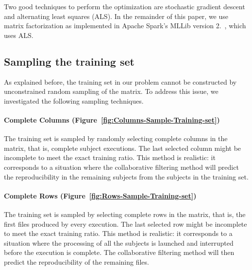 \documentclass[10pt, conference, compsocconf]{IEEEtran}
\newcommand{\todo}[1]{\marginpar{\parbox{18mm}{\flushleft\tiny\color{red}\textbf{TODO}:
      #1}}}
\begin{document}
Two good techniques to perform the optimization are stochastic gradient descent and alternating least squares (ALS). 
In the remainder of this paper, we use matrix factorization as implemented in 
Apache Spark's MLLib version 2.~\todo{xxx.}, which uses ALS.


\subsection{Sampling the training set}

As explained before, the training set in our problem cannot be 
constructed by unconstrained random sampling of the matrix.
To address this issue, we investigated the following sampling techniques. 

\paragraph{Complete Columns (Figure~\ref{fig:Columns-Sample-Training-set})}
The training set is sampled by randomly selecting complete columns in
the matrix, that is, complete subject executions. The last selected
column might be incomplete to meet the exact training ratio. This 
method is realistic: it corresponds to a situation where the 
collaborative filtering method will predict the reproducibility in the 
remaining subjects from the subjects in the training set. 

\paragraph{Complete Rows (Figure~\ref{fig:Rows-Sample-Training-set})} The training set is sampled by selecting complete 
rows in the matrix, that is, the first files produced by
every execution. The last selected row might be incomplete to meet the
exact training ratio. This method is realistic: it corresponds to a 
situation where the processing of all the subjects is launched and 
interrupted before the execution is complete. The collaborative 
filtering method will then predict the reproducibility of the remaining 
files.
\end{document}
